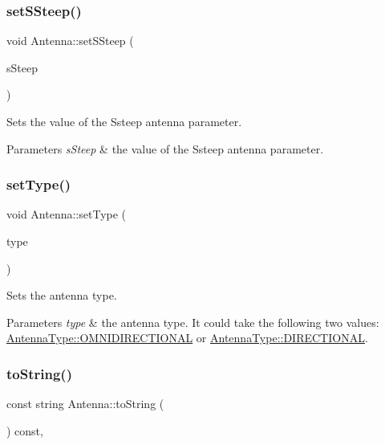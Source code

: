 \subsubsection{\texorpdfstring{setSSteep()}{setSSteep()}}
{\footnotesize\ttfamily void Antenna\+::set\+S\+Steep (\begin{DoxyParamCaption}\item[{double}]{s\+Steep }\end{DoxyParamCaption})}

Sets the value of the Ssteep antenna parameter. 
\begin{DoxyParams}{Parameters}
{\em s\+Steep} & the value of the Ssteep antenna parameter. \\
\hline
\end{DoxyParams}
\mbox{\label{class_antenna_aa9a8414c469e6dd49eed7a7cc58725c1}} 
\subsubsection{\texorpdfstring{setType()}{setType()}}
{\footnotesize\ttfamily void Antenna\+::set\+Type (\begin{DoxyParamCaption}\item[{\mbox{\hyperlink{_antenna_type_8h_a7b678b5cb9dedc607131200119d96b16}{Antenna\+Type}}}]{type }\end{DoxyParamCaption})}

Sets the antenna type. 
\begin{DoxyParams}{Parameters}
{\em type} & the antenna type. It could take the following two values\+: \mbox{\hyperlink{_antenna_type_8h_a7b678b5cb9dedc607131200119d96b16a8ff57fa72952e98025e600a041b8b8de}{Antenna\+Type\+::\+O\+M\+N\+I\+D\+I\+R\+E\+C\+T\+I\+O\+N\+AL}} or \mbox{\hyperlink{_antenna_type_8h_a7b678b5cb9dedc607131200119d96b16ab6f2249394a4def60a78b342dcc925b9}{Antenna\+Type\+::\+D\+I\+R\+E\+C\+T\+I\+O\+N\+AL}}. \\
\hline
\end{DoxyParams}
\mbox{\label{class_antenna_a7fea30e065f49a3cbcee02f60bd033c8}} 
\subsubsection{\texorpdfstring{toString()}{toString()}}
{\footnotesize\ttfamily const string Antenna\+::to\+String (\begin{DoxyParamCaption}{ }\end{DoxyParamCaption}) const\hspace{0.3cm}{\ttfamily [override]}, {\ttfamily [virtual]}}

